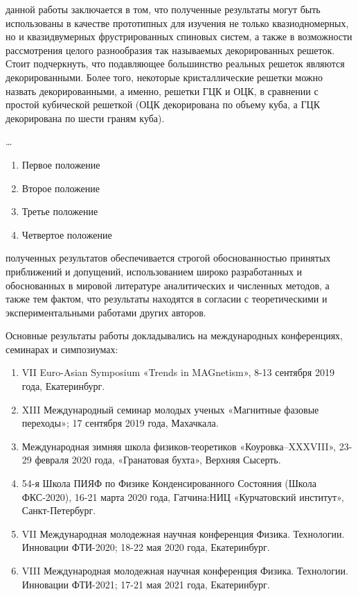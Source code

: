 {\influence} данной работы заключается в том, что полученные результаты могут быть использованы в качестве прототипных для изучения не только квазиодномерных, но и квазидвумерных фрустрированных спиновых систем, а также в возможности рассмотрения целого разнообразия так называемых декорированных решеток. Стоит подчеркнуть, что подавляющее большинство реальных решеток являются декорированными. Более того, некоторые кристаллические решетки можно назвать декорированными, а именно, решетки ГЦК и ОЦК, в сравнении с простой кубической решеткой (ОЦК декорирована по объему куба, а ГЦК декорирована по шести граням куба).

{\methods} \ldots

{}
\begin{enumerate}[beginpenalty=10000] %
  \item Первое положение
  \item Второе положение
  \item Третье положение
  \item Четвертое положение
\end{enumerate}

{\reliability} полученных результатов обеспечивается строгой обоснованностью принятых приближений и допущений, использованием широко разработанных и обоснованных в мировой литературе аналитических и численных методов, а также тем фактом, что результаты находятся в согласии с теоретическими и экспериментальными работами других авторов.

{\probation}
Основные результаты работы докладывались на международных конференциях, семинарах и симпозиумах:
\begin{enumerate} [beginpenalty=10000]
	\item VII Euro-Asian Symposium «Trends in MAGnetism», 8-13 сентября 2019 года, Екатеринбург.
	\item XIII Международный семинар молодых ученых «Магнитные фазовые переходы»; 17 сентября 2019 года, Махачкала.
	\item Международная зимняя школа физиков-теоретиков «Коуровка–XXXVIII», 23-29 февраля 2020 года, «Гранатовая бухта», Верхняя Сысерть.
	\item 54-я Школа ПИЯФ по Физике Конденсированного Состояния (Школа ФКС-2020), 16-21 марта 2020 года, Гатчина:НИЦ «Курчатовский институт», Санкт-Петербург.
	\item VII Международная молодежная научная конференция Физика. Технологии. Инновации ФТИ-2020; 18-22 мая 2020 года, Екатеринбург.
	\item VIII Международная молодежная научная конференция Физика. Технологии. Инновации ФТИ-2021; 17-21 мая 2021 года, Екатеринбург.
\end{enumerate}

